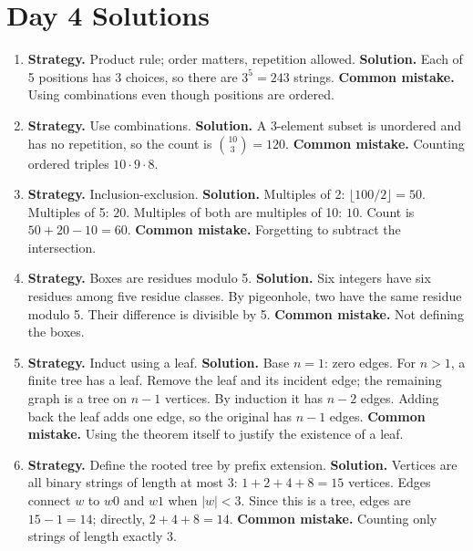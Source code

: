 \documentclass[11pt]{article}
\begin{document}
\section{Day 4 Solutions}
\begin{enumerate}[label=\textbf{4.\arabic*.}]
\item \textbf{Strategy.} Product rule; order matters, repetition allowed. \textbf{Solution.} Each of 5 positions has 3 choices, so there are $3^5=243$ strings. \textbf{Common mistake.} Using combinations even though positions are ordered.

\item \textbf{Strategy.} Use combinations. \textbf{Solution.} A 3-element subset is unordered and has no repetition, so the count is $\binom{10}{3}=120$. \textbf{Common mistake.} Counting ordered triples $10\cdot9\cdot8$.

\item \textbf{Strategy.} Inclusion-exclusion. \textbf{Solution.} Multiples of 2: $\lfloor100/2\rfloor=50$. Multiples of 5: $20$. Multiples of both are multiples of 10: $10$. Count is $50+20-10=60$. \textbf{Common mistake.} Forgetting to subtract the intersection.

\item \textbf{Strategy.} Boxes are residues modulo 5. \textbf{Solution.} Six integers have six residues among five residue classes. By pigeonhole, two have the same residue modulo 5. Their difference is divisible by 5. \textbf{Common mistake.} Not defining the boxes.

\item \textbf{Strategy.} Induct using a leaf. \textbf{Solution.} Base $n=1$: zero edges. For $n>1$, a finite tree has a leaf. Remove the leaf and its incident edge; the remaining graph is a tree on $n-1$ vertices. By induction it has $n-2$ edges. Adding back the leaf adds one edge, so the original has $n-1$ edges. \textbf{Common mistake.} Using the theorem itself to justify the existence of a leaf.

\item \textbf{Strategy.} Define the rooted tree by prefix extension. \textbf{Solution.} Vertices are all binary strings of length at most 3: $1+2+4+8=15$ vertices. Edges connect $w$ to $w0$ and $w1$ when $|w|<3$. Since this is a tree, edges are $15-1=14$; directly, $2+4+8=14$. \textbf{Common mistake.} Counting only strings of length exactly 3.
\end{enumerate}
\end{document}

